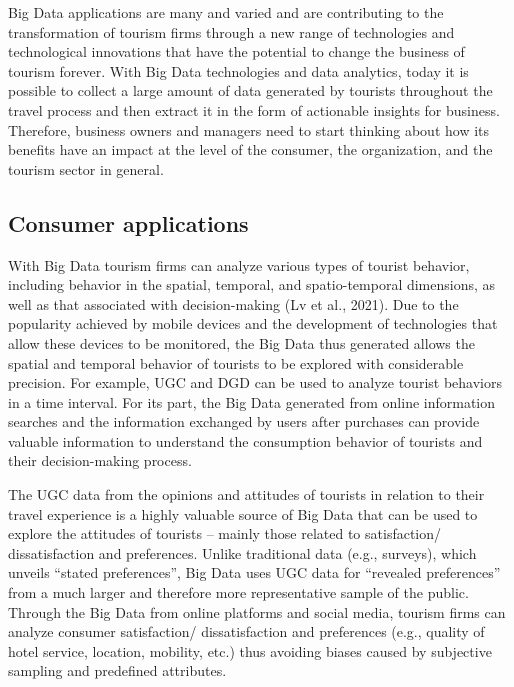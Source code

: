 \documentclass[
  letterpaper,
  DIV=11,
  numbers=noendperiod]{scrreprt}
\begin{document}
Big Data applications are many and varied and are contributing to the
transformation of tourism firms through a new range of technologies and
technological innovations that have the potential to change the business
of tourism forever. With Big Data technologies and data analytics, today
it is possible to collect a large amount of data generated by tourists
throughout the travel process and then extract it in the form of
actionable insights for business. Therefore, business owners and
managers need to start thinking about how its benefits have an impact at
the level of the consumer, the organization, and the tourism sector in
general.

\hypertarget{consumer-applications}{%
\subsection{Consumer applications}\label{consumer-applications}}

With Big Data tourism firms can analyze various types of tourist
behavior, including behavior in the spatial, temporal, and
spatio-temporal dimensions, as well as that associated with
decision-making (Lv et al., 2021). Due to the popularity achieved by
mobile devices and the development of technologies that allow these
devices to be monitored, the Big Data thus generated allows the spatial
and temporal behavior of tourists to be explored with considerable
precision. For example, UGC and DGD can be used to analyze tourist
behaviors in a time interval. For its part, the Big Data generated from
online information searches and the information exchanged by users after
purchases can provide valuable information to understand the consumption
behavior of tourists and their decision-making process.

The UGC data from the opinions and attitudes of tourists in relation to
their travel experience is a highly valuable source of Big Data that can
be used to explore the attitudes of tourists -- mainly those related to
satisfaction/ dissatisfaction and preferences. Unlike traditional data
(e.g., surveys), which unveils ``stated preferences'', Big Data uses UGC
data for ``revealed preferences'' from a much larger and therefore more
representative sample of the public. Through the Big Data from online
platforms and social media, tourism firms can analyze consumer
satisfaction/ dissatisfaction and preferences (e.g., quality of hotel
service, location, mobility, etc.) thus avoiding biases caused by
subjective sampling and predefined attributes.
\end{document}
